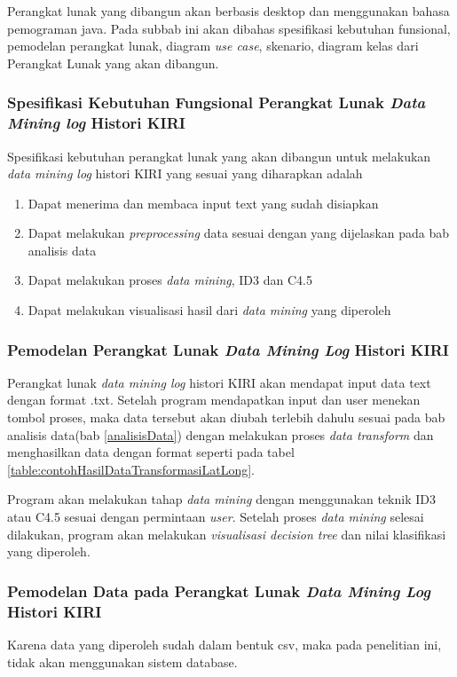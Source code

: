 Perangkat lunak yang dibangun akan berbasis desktop dan menggunakan bahasa pemograman java. Pada subbab ini akan dibahas spesifikasi kebutuhan funsional, pemodelan perangkat lunak, diagram \textsl{use case}, skenario, diagram kelas dari Perangkat Lunak yang akan dibangun.

\subsubsection{Spesifikasi Kebutuhan Fungsional Perangkat Lunak \textsl{Data Mining log} Histori KIRI}
Spesifikasi kebutuhan perangkat lunak yang akan dibangun untuk melakukan \textsl{data mining log} histori KIRI yang sesuai yang diharapkan adalah
\begin{enumerate}
	\item Dapat menerima dan membaca input text yang sudah disiapkan
	\item Dapat melakukan \textsl{preprocessing} data sesuai dengan yang dijelaskan pada bab analisis data
	\item Dapat melakukan proses \textsl{data mining}, ID3 dan C4.5
	\item Dapat melakukan visualisasi hasil dari \textsl{data mining} yang diperoleh
\end{enumerate}

\subsubsection{Pemodelan Perangkat Lunak \textsl{Data Mining Log} Histori KIRI}
Perangkat lunak \textsl{data mining log} histori KIRI akan mendapat input data text dengan format .txt. Setelah program mendapatkan input dan user menekan tombol proses, maka data tersebut akan diubah terlebih dahulu sesuai pada bab analisis data(bab \ref{analisisData}) dengan melakukan proses \textsl{data transform} dan menghasilkan data dengan format seperti pada tabel \ref{table:contohHasilDataTransformasiLatLong}.

Program akan melakukan tahap \textsl{data mining} dengan menggunakan teknik ID3 atau C4.5 sesuai dengan permintaan \textsl{user}. Setelah proses \textsl{data mining} selesai dilakukan, program akan melakukan \textsl{visualisasi decision tree} dan nilai klasifikasi yang diperoleh.  

\subsubsection{Pemodelan Data pada Perangkat Lunak \textsl{Data Mining Log} Histori KIRI}
Karena data yang diperoleh sudah dalam bentuk csv, maka pada penelitian ini, tidak akan menggunakan sistem database. 

